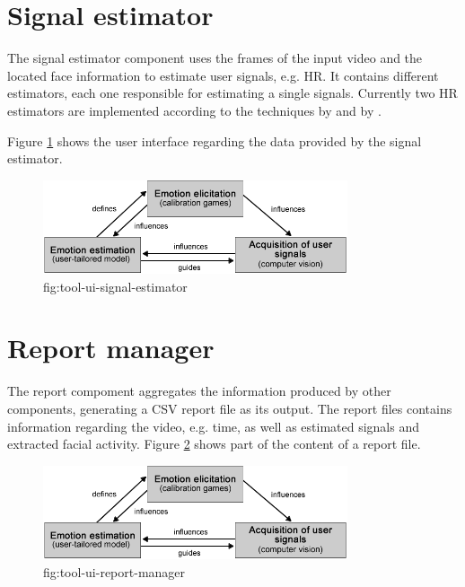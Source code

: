 \section{Signal estimator}

The signal estimator component uses the frames of the input video and the located face information to estimate user signals, e.g. HR. It contains different estimators, each one responsible for estimating a single signals. Currently two HR estimators are implemented according to the techniques by \textcite{poh2010non} and by \textcite{poh2011advancements}.

Figure \ref{fig:tool-ui-signal-estimator} shows the user interface regarding the data provided by the signal estimator.

\begin{figure}[h]
    \centering
    \includegraphics[width=0.8\textwidth]{figures/method-components-dependency.png}
    \caption{fig:tool-ui-signal-estimator}
    \label{fig:tool-ui-signal-estimator}
\end{figure}

\section{Report manager}

The report compoment aggregates the information produced by other components, generating a CSV report file as its output. The report files contains information regarding the video, e.g. time, as well as estimated signals and extracted facial activity. Figure \ref{fig:tool-ui-report-manager} shows part of the content of a report file.

\begin{figure}[h]
    \centering
    \includegraphics[width=0.8\textwidth]{figures/method-components-dependency.png}
    \caption{fig:tool-ui-report-manager}
    \label{fig:tool-ui-report-manager}
\end{figure}
